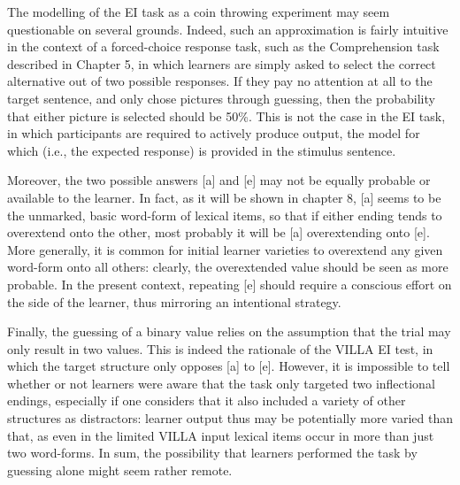 The modelling of the EI task as a coin throwing experiment may seem questionable on several grounds. Indeed, such an approximation is fairly intuitive in the context of a forced-choice response task, such as the Comprehension task described in Chapter 5, in which learners are simply asked to select the correct alternative out of two possible responses. If they pay no attention at all to the target sentence, and only chose pictures through guessing, then the probability that either picture is selected should be 50\%. This is not the case in the EI task, in which participants are required to actively produce output, the model for which (i.e., the expected response) is provided in the stimulus sentence. 

Moreover, the two possible answers [a] and [e] may not be equally probable or available to the learner. In fact, as it will be shown in chapter 8, [a] seems to be the unmarked, basic word-form of lexical items, so that if either ending tends to overextend onto the other, most probably it will be [a] overextending onto [e]. More generally, it is common for initial learner varieties to overextend any given word-form onto all others: clearly, the overextended value should be seen as more probable. In the present context, repeating [e] should require a conscious effort on the side of the learner, thus mirroring an intentional strategy. 

Finally, the guessing of a binary value relies on the assumption that the trial may only result in two values. This is indeed the rationale of the VILLA EI test, in which the target structure only opposes [a] to [e]. However, it is impossible to tell whether or not learners were aware that the task only targeted two inflectional endings, especially if one considers that it also included a variety of other structures as distractors: learner output thus may be potentially more varied than that, as even in the limited VILLA input lexical items occur in more than just two word-forms. In sum, the possibility that learners performed the task by guessing alone might seem rather remote.

